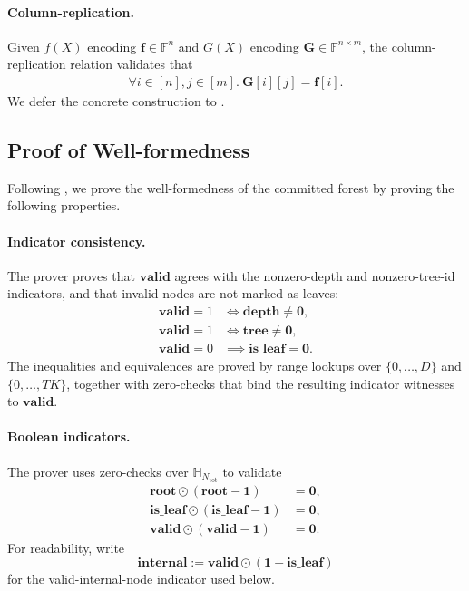 \paragraph{Column-replication.}
Given $f(X)$ encoding $\mathbf{f}\in \mathbb{F}^{n}$
    and $G(X)$ encoding $\mathbf{G}\in \mathbb{F}^{n\times m}$,
    the column-replication relation validates that 
    \begin{align}
        \forall i\in [n], j\in [m].\ \mathbf{G}[i][j] = \mathbf{f}[i].
    \end{align}
    We defer the concrete construction to .

\subsection{Proof of Well-formedness}

Following ,
    we prove the well-formedness of the committed forest by proving the following properties.

\paragraph{Indicator consistency.}
The prover proves that $\mathbf{valid}$ agrees with the nonzero-depth and
nonzero-tree-id indicators, and that invalid nodes are not marked as leaves:
\begin{align}
    \mathbf{valid}=1 &\iff \mathbf{depth} \neq \mathbf{0},\\
    \mathbf{valid}=1 &\iff \mathbf{tree} \neq \mathbf{0},\\
    \mathbf{valid}=0 &\implies \mathbf{is\_leaf} = \mathbf{0}.
\end{align}
The inequalities and equivalences are proved by range lookups over
$\{0,\ldots,D\}$ and $\{0,\ldots,TK\}$, together with zero-checks that bind the
resulting indicator witnesses to $\mathbf{valid}$.

\paragraph{Boolean indicators.}
The prover uses zero-checks over $\mathbb{H}_{N_{\mathrm{tot}}}$ to validate
\begin{align}
    \mathbf{root}\odot(\mathbf{root}-\mathbf{1}) &= \mathbf{0},\\
    \mathbf{is\_leaf}\odot(\mathbf{is\_leaf}-\mathbf{1}) &= \mathbf{0},\\
    \mathbf{valid}\odot(\mathbf{valid}-\mathbf{1}) &= \mathbf{0}.
\end{align}
For readability, write
\[
    \mathbf{internal}:=\mathbf{valid}\odot(\mathbf{1}-\mathbf{is\_leaf})
\]
for the valid-internal-node indicator used below.

